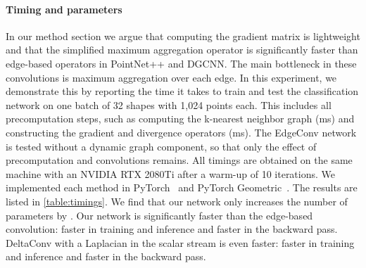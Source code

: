 \documentclass[acmtog, authorversion]{acmart}
\begin{document}
\begin{table}[t]
\end{table} \begin{table}[b]
    \caption{Timing and parameter counts for classification on ModelNet40. The timing for training and inference includes all necessary precomputations.}
    \label{table:timings}
    \begin{center}
    \end{center}
\end{table} 
\paragraph*{Timing and parameters} In our method section we argue that computing the gradient matrix is lightweight and that the simplified maximum aggregation operator is significantly faster than edge-based operators in PointNet++ and DGCNN. The main bottleneck in these convolutions is maximum aggregation over each edge. In this experiment, we demonstrate this by reporting the time it takes to train and test the classification network on one batch of 32 shapes with 1,024 points each. This includes all precomputation steps, such as computing the k-nearest neighbor graph (ms) and constructing the gradient and divergence operators (ms). The EdgeConv network is tested without a dynamic graph component, so that only the effect of precomputation and convolutions remains. All timings are obtained on the same machine with an NVIDIA RTX 2080Ti after a warm-up of 10 iterations. We implemented each method in PyTorch~\cite{pytorch} and PyTorch Geometric~\cite{Fey/Lenssen/2019}.
The results are listed in \autoref{table:timings}. We find that our network only increases the number of parameters by . Our network is significantly faster than the edge-based convolution:  faster in training and inference and  faster in the backward pass. DeltaConv with a Laplacian in the scalar stream is even faster:  faster in training and inference and  faster in the backward pass.
\end{document}
